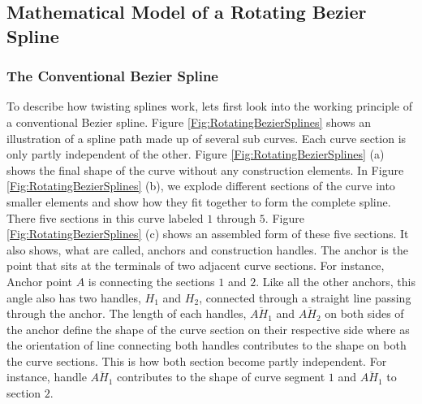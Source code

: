     \subsection{Mathematical Model of a Rotating Bezier Spline}
    \subsubsection{The Conventional Bezier Spline}
        To describe how twisting splines work, lets first look into the working principle of a conventional Bezier spline. Figure \ref{Fig:RotatingBezierSplines} shows an illustration of a spline path made up of several sub curves. Each curve section is only partly independent of the other. Figure \ref{Fig:RotatingBezierSplines}  (a) shows the final shape of the curve without any construction elements. In Figure \ref{Fig:RotatingBezierSplines} (b), we explode different sections of the curve into smaller elements and show how they fit together to form the complete spline. There five sections in this curve labeled $1$ through $5$. Figure \ref{Fig:RotatingBezierSplines} (c) shows an assembled form of these five sections. It also shows, what are called, anchors and construction handles. The anchor is the point that sits at the terminals of two adjacent curve sections. For instance, Anchor point $A$  is connecting the sections $1$ and $2$. Like all the other anchors, this angle also has two handles, $H_1$ and $H_2$, connected through a straight line passing through the anchor. The length of each handles, $\overline{AH_1}$  and $\overline{AH_2}$ on both sides of the anchor define the shape of the curve section on their respective side where as the orientation of line connecting both handles contributes to the shape on both the curve sections. This is how both section become partly independent. For instance, handle $\overline{AH_1}$ contributes to the shape of curve segment $1$ and $\overline{AH_1}$ to section $2$.


